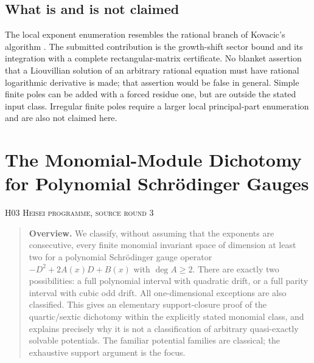 \documentclass[11pt,a4paper]{article}
\theoremstyle{definition}\newtheorem{definition}[theorem]{Definition}
\theoremstyle{remark}\newtheorem{remark}[theorem]{Remark}
\numberwithin{equation}{section}
\begin{document}
\subsection{What is and is not claimed}\label{H02-sec-6}
The local exponent enumeration resembles the rational branch of Kovacic's algorithm \cite{ref082}. The submitted contribution is the growth-shift sector bound and its integration with a complete rectangular-matrix certificate. No blanket assertion that a Liouvillian solution of an arbitrary rational equation must have rational logarithmic derivative is made; that assertion would be false in general. Simple finite poles can be added with a forced residue one, but are outside the stated input class. Irregular finite poles require a larger local principal-part enumeration and are also not claimed here.




\clearpage
\section[H03 --- The Monomial-Module Dichotomy for Polynomial Schr\"odinger Gauges]{The Monomial-Module Dichotomy for Polynomial Schr\"odinger Gauges}\label{contrib-H03}
\noindent\textsc{H03 \quad Heisei programme, source round 3}\par\medskip






\begin{quote}\small\textbf{Overview.} We classify, without assuming that the exponents are consecutive, every finite monomial invariant space of dimension at least two for a polynomial Schr\"odinger gauge operator $-D^2+2A(x)D+B(x)$ with $\deg A\ge2$. There are exactly two possibilities: a full polynomial interval with quadratic drift, or a full parity interval with cubic odd drift. All one-dimensional exceptions are also classified. This gives an elementary support-closure proof of the quartic/sextic dichotomy within the explicitly stated monomial class, and explains precisely why it is not a classification of arbitrary quasi-exactly solvable potentials. The familiar potential families are classical; the exhaustive support argument is the focus.\end{quote}
\end{document}
